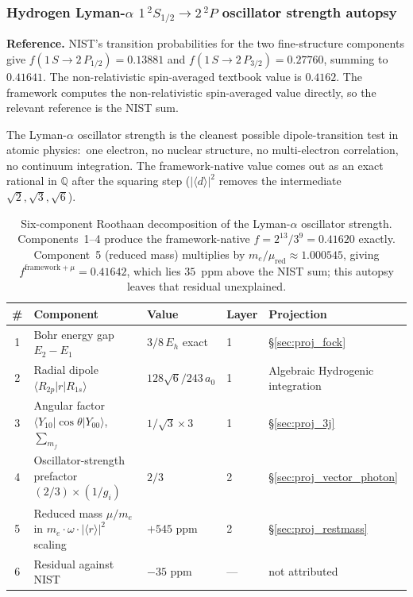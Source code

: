 \documentclass[11pt]{article}
\begin{document}
\subsubsection{Hydrogen Lyman-$\alpha$ $1\,^{2}S_{1/2} \to 2\,^{2}P$ oscillator strength autopsy}
\label{sec:autopsy_lyman_alpha}

\textbf{Reference.} NIST's transition probabilities for the two
fine-structure components give $f(1\,S \to 2\,P_{1/2}) = 0.13881$ and
$f(1\,S \to 2\,P_{3/2}) = 0.27760$, summing to $0.41641$.  The
non-relativistic spin-averaged textbook value is $0.4162$.  The
framework computes the non-relativistic spin-averaged value
directly, so the relevant reference is the NIST sum.

The Lyman-$\alpha$ oscillator strength is the cleanest possible
dipole-transition test in atomic physics:\ one electron, no nuclear
structure, no multi-electron correlation, no continuum integration.
The framework-native value comes out as an exact rational in $\mathbb{Q}$
after the squaring step ($|\langle d \rangle|^2$ removes the
intermediate $\sqrt{2}, \sqrt{3}, \sqrt{6}$).

\begin{table}[h!]
\centering\small
\caption{Six-component Roothaan decomposition of the Lyman-$\alpha$
oscillator strength.  Components~1--4 produce the framework-native
$f = 2^{13}/3^9 = 0.41620$ exactly.  Component~5 (reduced mass)
multiplies by $m_e/\mu_{\mathrm{red}} \approx 1.000545$, giving
$f^{\text{framework}+\mu} = 0.41642$, which lies $35$~ppm above the
NIST sum; this autopsy leaves that residual unexplained.}
\label{tab:autopsy_lyman_alpha}
\begin{tabular}{cllll}
\toprule
\# & Component & Value & Layer & Projection \\
\midrule
1 & Bohr energy gap $E_2 - E_1$ & $3/8\, E_h$ exact & 1 & \S\ref{sec:proj_fock} \\
2 & Radial dipole $\langle R_{2p}|r|R_{1s}\rangle$ & $128\sqrt{6}/243\,a_0$ & 1 & Algebraic Hydrogenic integration \\
3 & Angular factor $\langle Y_{10}|\cos\theta|Y_{00}\rangle$, $\sum_{m_f}$ & $1/\sqrt{3} \times 3$ & 1 & \S\ref{sec:proj_3j} \\
4 & Oscillator-strength prefactor $(2/3) \times (1/g_i)$ & $2/3$ & 2 & \S\ref{sec:proj_vector_photon} \\
5 & Reduced mass $\mu/m_e$ in $m_e \cdot \omega \cdot |\langle r \rangle|^2$ scaling & $+545$ ppm & 2 & \S\ref{sec:proj_restmass} \\
6 & Residual against NIST & $-35$ ppm & --- & not attributed \\
\bottomrule
\end{tabular}
\end{table}
\end{document}
